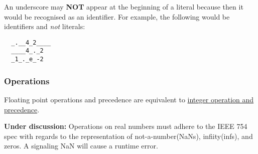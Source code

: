 \documentclass[types.tex]{subfiles}
\begin{document}
An underscore may \textbf{NOT} appear at the beginning of a  literal because then it
would be recognised as an identifier. For example, the following would be identifiers and
\textit{not}  literals:
\begin{lstlisting}
  _.__4_2____
  ____4_._2
  _1_._e_-2
\end{lstlisting}

\subsubsection{Operations}
Floating point operations and precedence are equivalent to \hyperref[sssec:integer_ops]{integer
operation and precedence}.

\textbf{Under discussion:} Operations on real numbers must adhere to the \textsf{IEEE 754} spec with
regards to the representation of not-a-number(NaNs), infiity(infs), and zeros. A signaling NaN will
cause a runtime error.
\end{document}
